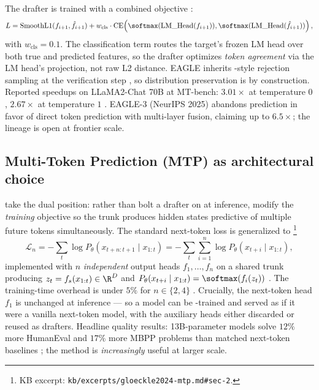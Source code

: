 The drafter is trained with a combined objective \citep[\S 3.2]{li2024-eagle}:
\begin{equation}
L = \operatorname{SmoothL1}(f_{i+1}, \hat f_{i+1}) + w_{\text{cls}} \cdot \operatorname{CE}\!\left(\softmax(\text{LM\_Head}(f_{i+1})), \softmax(\text{LM\_Head}(\hat f_{i+1}))\right),
\label{eq:eagle-loss}
\end{equation}
with $w_{\text{cls}} = 0.1$. The classification term routes the
target's frozen LM head over both true and predicted features, so the
drafter optimizes \emph{token agreement} via the LM head's projection,
not raw  L2 distance. EAGLE inherits -style rejection
sampling at the verification step \citep[\S 3.3]{li2024-eagle}, so
distribution preservation is by construction. Reported speedups on
LLaMA2-Chat 70B at MT-bench: $3.01\times$ at temperature $0$,
$2.67\times$ at temperature $1$ \citep[Fig.~1]{li2024-eagle}. EAGLE-3
\citep{eagle3-2025} (NeurIPS 2025) abandons  prediction in
favor of direct token prediction with multi-layer  fusion,
claiming up to $6.5\times$; the lineage is open at frontier scale.

\subsection{Multi-Token Prediction (MTP) as architectural choice}
\label{sec:mt-mtp}

\citet{gloeckle2024-mtp} take the dual position: rather than bolt a
drafter on at inference, modify the \emph{training} objective so the
trunk produces hidden states predictive of multiple future tokens
simultaneously. The standard next-token loss is generalized to
\citep[\S 2, Eq.~1]{gloeckle2024-mtp}\footnote{KB excerpt:
\nolinkurl{kb/excerpts/gloeckle2024-mtp.md#sec-2}.}
\begin{equation}
\mathcal{L}_n = -\sum_t \log P_\theta(x_{t+n:t+1} \mid x_{1:t}) = -\sum_t \sum_{i=1}^{n} \log P_\theta(x_{t+i} \mid x_{1:t}),
\label{eq:mtp-loss}
\end{equation}
implemented with $n$ \emph{independent} output heads $f_1, \ldots,
f_n$ on a shared trunk producing $z_t = f_s(x_{1:t}) \in \R^D$ and
$P_\theta(x_{t+i} \mid x_{1:t}) = \softmax(f_i(z_t))$
\citep[\S 3]{gloeckle2024-mtp}. The training-time overhead is under
$5\%$ for $n \in \{2, 4\}$ \citep[\S 3]{gloeckle2024-mtp}.
Crucially, the next-token head $f_1$ is unchanged at inference --- so
a model can be -trained and served as if it were a vanilla
next-token model, with the auxiliary heads either discarded or reused
as drafters. Headline quality results: 13B-parameter  models solve
$12\%$ more HumanEval and $17\%$ more MBPP problems than matched
next-token baselines \citep[abstract]{gloeckle2024-mtp}; the method is
\emph{increasingly} useful at larger scale.

